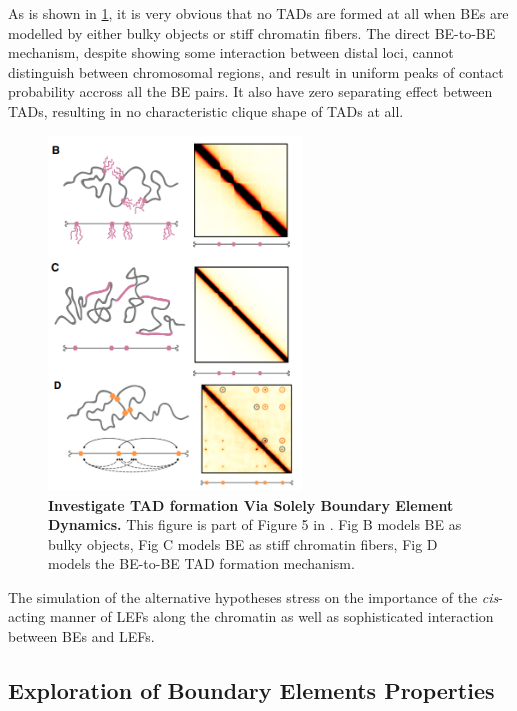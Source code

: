 \documentclass[11pt]{article}
\begin{document}
As is shown in \cref{fig:Investigate TAD formation Via Solely Boundary Element Dynamics}, it is very obvious that no TADs are formed at all when BEs are modelled by either bulky objects or stiff chromatin fibers. The direct BE-to-BE mechanism, despite showing some interaction between distal loci, cannot distinguish between chromosomal regions, and result in uniform peaks of contact probability accross all the BE pairs. It also have zero separating effect between TADs, resulting in no characteristic clique shape of TADs at all.

\begin{figure}[htbp]
  \centering
  \includegraphics[width=0.6\textwidth]{assets/Snipaste_2023-01-13_18-53-59.png}
  \caption{\textbf{Investigate TAD formation Via Solely Boundary Element Dynamics.} This figure is part of Figure 5 in \cite{fudenberg_formation_2016}. Fig B models BE as bulky objects, Fig C models BE as stiff chromatin fibers, Fig D models the BE-to-BE TAD formation mechanism.}
  \label{fig:Investigate TAD formation Via Solely Boundary Element Dynamics}
\end{figure}

The simulation of the alternative hypotheses stress on the importance of the \textit{cis}-acting manner of LEFs along the chromatin as well as sophisticated interaction between BEs and LEFs.

\subsection{Exploration of Boundary Elements Properties}
\end{document}
